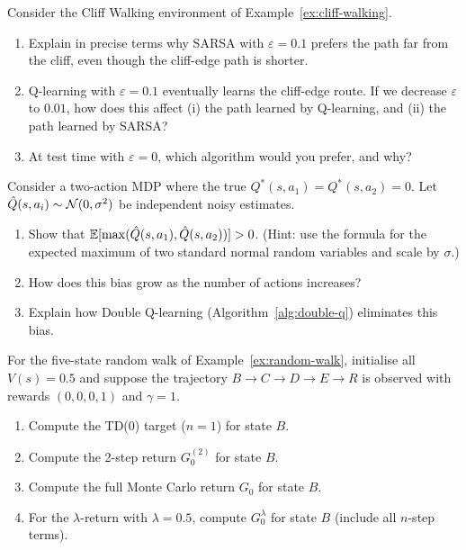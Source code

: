 \begin{exercise}
\label{ex:sarsa-vs-qlearn}
Consider the Cliff Walking environment of Example~\ref{ex:cliff-walking}.
\begin{enumerate}[label=(\alph*)]
  \item Explain in precise terms why SARSA with $\varepsilon=0.1$ prefers the path far from the cliff, even though the cliff-edge path is shorter.
  \item Q-learning with $\varepsilon=0.1$ eventually learns the cliff-edge route.  If we decrease $\varepsilon$ to $0.01$, how does this affect (i) the path learned by Q-learning, and (ii) the path learned by SARSA?
  \item At test time with $\varepsilon=0$, which algorithm would you prefer, and why?
\end{enumerate}
\end{exercise}

\begin{exercise}
\label{ex:max-bias}
Consider a two-action MDP where the true $Q^*(s,a_1)=Q^*(s,a_2)=0$.  Let $\hat Q(s,a_i)\sim\mathcal{N}(0,\sigma^2)$ be independent noisy estimates.
\begin{enumerate}[label=(\alph*)]
  \item Show that $\operatorname{\mathbb{E}}[\max(\hat Q(s,a_1),\hat Q(s,a_2))]>0$.  (Hint: use the formula for the expected maximum of two standard normal random variables and scale by $\sigma$.)
  \item How does this bias grow as the number of actions increases?
  \item Explain how Double Q-learning (Algorithm~\ref{alg:double-q}) eliminates this bias.
\end{enumerate}
\end{exercise}

\begin{exercise}
\label{ex:nstep-returns}
For the five-state random walk of Example~\ref{ex:random-walk}, initialise all $V(s)=0.5$ and suppose the trajectory $B\to C\to D\to E\to R$ is observed with rewards $(0,0,0,1)$ and $\gamma=1$.
\begin{enumerate}[label=(\alph*)]
  \item Compute the TD(0) target ($n=1$) for state $B$.
  \item Compute the 2-step return $G_0^{(2)}$ for state $B$.
  \item Compute the full Monte Carlo return $G_0$ for state $B$.
  \item For the $\lambda$-return with $\lambda=0.5$, compute $G_0^\lambda$ for state $B$ (include all $n$-step terms).
\end{enumerate}
\end{exercise}

